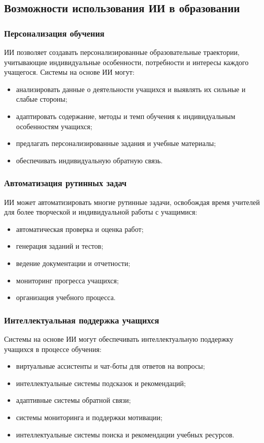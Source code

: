 \documentclass[a4paper,14pt]{extreport}
\begin{document}
\subsection{Возможности использования ИИ в образовании}

\subsubsection{Персонализация обучения}

ИИ позволяет создавать персонализированные образовательные траектории, учитывающие индивидуальные особенности, потребности и интересы каждого учащегося. Системы на основе ИИ могут:
\begin{itemize}
    \item анализировать данные о деятельности учащихся и выявлять их сильные и слабые стороны;
    \item адаптировать содержание, методы и темп обучения к индивидуальным особенностям учащихся;
    \item предлагать персонализированные задания и учебные материалы;
    \item обеспечивать индивидуальную обратную связь.
\end{itemize}

\subsubsection{Автоматизация рутинных задач}

ИИ может автоматизировать многие рутинные задачи, освобождая время учителей для более творческой и индивидуальной работы с учащимися:
\begin{itemize}
    \item автоматическая проверка и оценка работ;
    \item генерация заданий и тестов;
    \item ведение документации и отчетности;
    \item мониторинг прогресса учащихся;
    \item организация учебного процесса.
\end{itemize}
\subsubsection{Интеллектуальная поддержка учащихся}

Системы на основе ИИ могут обеспечивать интеллектуальную поддержку учащихся в процессе обучения:
\begin{itemize}
    \item виртуальные ассистенты и чат-боты для ответов на вопросы;
    \item интеллектуальные системы подсказок и рекомендаций;
    \item адаптивные системы обратной связи;
    \item системы мониторинга и поддержки мотивации;
    \item интеллектуальные системы поиска и рекомендации учебных ресурсов.
\end{itemize}
\end{document}
